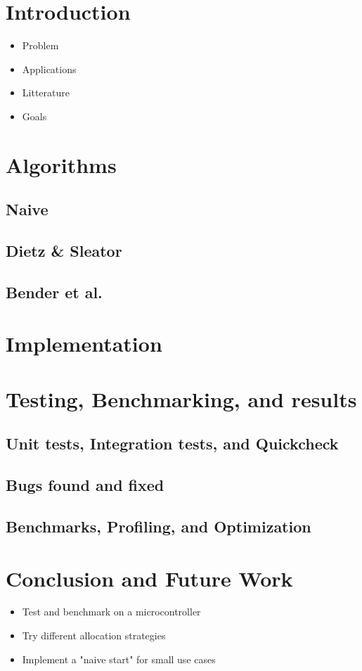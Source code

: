 \documentclass[12pt]{article}
\begin{document}
\newpage
\section{Introduction}

\begin{itemize}
	\item Problem
	\item Applications
	\item Litterature
	\item Goals
\end{itemize}

\newpage
\section{Algorithms}

\subsection{Naive}
\subsection{Dietz \& Sleator}
\subsection{Bender et al.}


\newpage
\section{Implementation}

\newpage
\section{Testing, Benchmarking, and results}

\subsection{Unit tests, Integration tests, and Quickcheck}

\subsection{Bugs found and fixed}

\subsection{Benchmarks, Profiling, and Optimization}


\newpage
\section{Conclusion and Future Work}

\begin{itemize}
	\item Test and benchmark on a microcontroller
	\item Try different allocation strategies
	\item Implement a "naive start" for small use cases
\end{itemize}

\printbibliography
\end{document}
